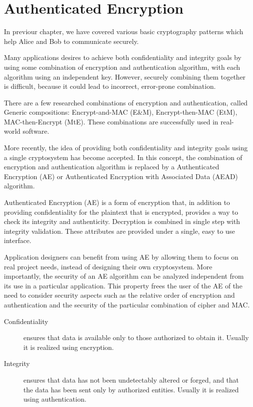 \chapter{Authenticated Encryption}

In previour chapter, we have covered various basic cryptography patterns which help Alice and Bob to communicate securely.

Many applications desires to achieve both confidentiality and integrity goals by using some combination of encryption and authentication algorithm, with each algorithm using an independent key. However, securely combining them together is difficult, because it could lead to incorrect, error-prone combination.

There are a few researched combinations of encryption and authentication, called Generic compositions: Encrypt-and-MAC (E\&M), Encrypt-then-MAC (EtM), MAC-then-Encrypt (MtE). These combinations are successfully used in real-world software.

More recently, the idea of providing both confidentiality and integrity goals using a single cryptosystem has become accepted. In this concept, the combination of encryption and authentication algorithm is replaced by a Authenticated Encryption (AE) or Authenticated Encryption with Associated Data (AEAD) algorithm.

Authenticated Encryption (AE) is a form of encryption that, in addition to providing confidentiality for the plaintext that is encrypted, provides a way to check its integrity and authenticity. Decryption is combined in single step with integrity validation. These attributes are provided under a single, easy to use interface.

Application designers can benefit from using AE by allowing them to focus on real project needs, instead of designing their own cryptosystem. More importantly, the security of an AE algorithm can be analyzed independent from its use in a particular application. This property frees the user of the AE of the need to consider security aspects such as the relative order of encryption and authentication and the security of the particular combination of cipher and MAC.

\begin{description}
  \item[Confidentiality] ensures that data is available only to those authorized to obtain it. Usually it is realized using encryption.
  \item[Integrity] ensures that data has not been undetectably altered or forged, and that the data has been sent only by authorized entities. Usually it is realized using authentication.
\end{description}


